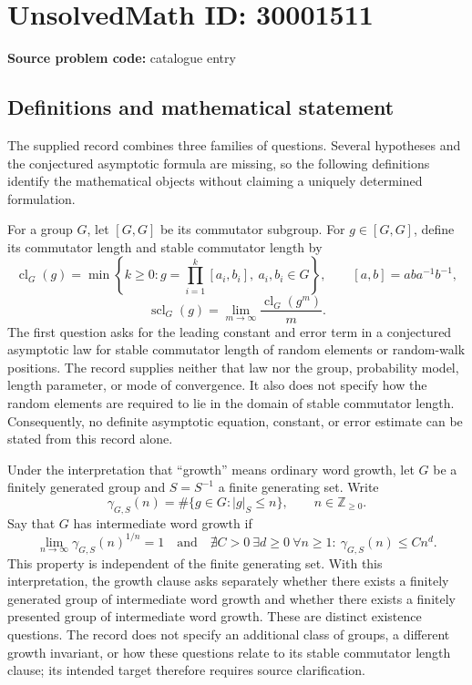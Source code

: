 \documentclass[11pt]{article}
\begin{document}
\section*{UnsolvedMath ID: 30001511}
\textbf{Source problem code:} catalogue entry
\subsection{Definitions and mathematical statement}
The supplied record combines three families of questions. Several hypotheses and the conjectured asymptotic formula are missing, so the following definitions identify the mathematical objects without claiming a uniquely determined formulation.

For a group \(G\), let \([G,G]\) be its commutator subgroup. For \(g\in[G,G]\), define its commutator length and stable commutator length by
\[
\operatorname{cl}_G(g)=\min\left\{k\geq 0:g=\prod_{i=1}^{k}[a_i,b_i],\ a_i,b_i\in G\right\},\qquad [a,b]=aba^{-1}b^{-1},
\]
\[
\operatorname{scl}_G(g)=\lim_{m\to\infty}\frac{\operatorname{cl}_G(g^m)}{m}.
\]
The first question asks for the leading constant and error term in a conjectured asymptotic law for stable commutator length of random elements or random-walk positions. The record supplies neither that law nor the group, probability model, length parameter, or mode of convergence. It also does not specify how the random elements are required to lie in the domain of stable commutator length. Consequently, no definite asymptotic equation, constant, or error estimate can be stated from this record alone.

Under the interpretation that ``growth'' means ordinary word growth, let \(G\) be a finitely generated group and \(S=S^{-1}\) a finite generating set. Write
\[
\gamma_{G,S}(n)=\#\{g\in G:|g|_S\leq n\},\qquad n\in\mathbb Z_{\geq 0}.
\]
Say that \(G\) has intermediate word growth if
\[
\lim_{n\to\infty}\gamma_{G,S}(n)^{1/n}=1
\quad\text{and}\quad
\nexists C>0\ \exists d\geq 0\ \forall n\geq 1:\ \gamma_{G,S}(n)\leq Cn^d.
\]
This property is independent of the finite generating set. With this interpretation, the growth clause asks separately whether there exists a finitely generated group of intermediate word growth and whether there exists a finitely presented group of intermediate word growth. These are distinct existence questions. The record does not specify an additional class of groups, a different growth invariant, or how these questions relate to its stable commutator length clause; its intended target therefore requires source clarification.
\end{document}
